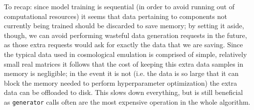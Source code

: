 To recap: since model training is sequential (in order to avoid running out of computational resources) it seems that data pertaining to components not currently being trained should be discarded to save memory; by setting it aside, though, we can avoid performing wasteful data generation requests in the future, as those extra requests would ask for exactly the data that we are saving. Since the typical data used in cosmological emulation is comprised of simple, relatively small real matrices it follows that the cost of keeping this extra data samples in memory is negligible; in the event it is not (i.e. the data is so large that it can block the memory needed to perform hyperparameter optimization) the extra data can be offloaded to disk. This slows down everything, but is still beneficial as \texttt{generator} calls often are the most expensive operation in the whole algorithm.

